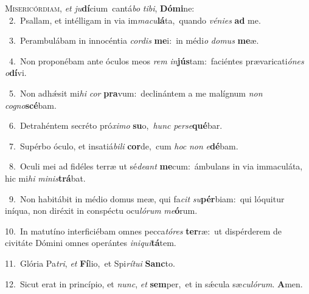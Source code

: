 \lettrine{\initial\textcolor{\initialcolor}{M}}{isericórdiam,} \textit{et} \textit{ju}\-\textbf{dí}cium~\star cantá\textit{bo} \textit{ti}\-\textit{bi}, \textbf{Dó}\-\textbf{mi}ne:\\
{\numbfont\textcolor{\numbcolor}{~2.}}~Psallam, et intélligam in via im\-\textit{ma}\-\textit{cu}\textbf{lá}ta,~\star quando \textit{vé}\-\textit{ni}\textit{es} \textbf{ad} me.\par
{\numbfont\textcolor{\numbcolor}{~3.}}~Perambulábam in innocéntia \textit{cor}\-\textit{dis} \textbf{me}\-i:~\star in médi\textit{o} \textit{do}\-\textit{mus} \textbf{me}\-æ.\par
{\numbfont\textcolor{\numbcolor}{~4.}}~Non proponébam ante óculos meos \textit{rem} \textit{in}\-\textbf{jús}tam:~\star faciéntes prævaricati\-\textit{ó}\-\textit{nes} \textit{o}\-\textbf{dí}vi.\par
{\numbfont\textcolor{\numbcolor}{~5.}}~Non adhǽsit mi\textit{hi} \textit{cor} \textbf{pra}\-vum:~\star declinántem a me malígnum \textit{non} \textit{co}\-\textit{gno}\textbf{scé}bam.\par
{\numbfont\textcolor{\numbcolor}{~6.}}~Detrahéntem secréto pró\-\textit{xi}\-\textit{mo} \textbf{su}\-o,~\star \textit{hunc} \textit{per}\-\textit{se}\textbf{qué}bar.\par
{\numbfont\textcolor{\numbcolor}{~7.}}~Supérbo óculo, et insatiá\-\textit{bi}\-\textit{li} \textbf{cor}\-de,~\star cum \textit{hoc} \textit{non} \textit{e}\-\textbf{dé}bam.\par
{\numbfont\textcolor{\numbcolor}{~8.}}~Oculi mei ad fidéles terræ ut sé\-\textit{de}\-\textit{ant} \textbf{me}\-cum:~\star ámbulans in via immaculáta, hic mi\textit{hi} \textit{mi}\-\textit{nis}\textbf{trá}bat.\par
{\numbfont\textcolor{\numbcolor}{~9.}}~Non habitábit in médio domus meæ, qui fa\textit{cit} \textit{su}\-\textbf{pér}biam:~\star qui lóquitur iníqua, non diréxit in conspéctu ocu\-\textit{ló}\-\textit{rum} \textit{me}\-\textbf{ó}rum.\par
{\numbfont\textcolor{\numbcolor}{10.}}~In matutíno interficiébam omnes pecca\-\textit{tó}\-\textit{res} \textbf{ter}\-ræ:~\star ut dispérderem de civitáte Dómini omnes operántes \textit{in}\-\textit{i}\textit{qui}\textbf{tá}tem.\par
{\numbfont\textcolor{\numbcolor}{11.}}~Glória Pa\-\textit{tri}\-, \textit{et} \textbf{Fí}\-lio,~\star et Spi\-\textit{rí}\-\textit{tu}\textit{i} \textbf{Sanc}\-to.\par
{\numbfont\textcolor{\numbcolor}{12.}}~Sicut erat in princípio, et \textit{nunc}\-, \textit{et} \textbf{sem}\-per,~\star et in sǽcula sæ\-\textit{cu}\-\textit{ló}\textit{rum}. \textbf{A}\-men.\par
